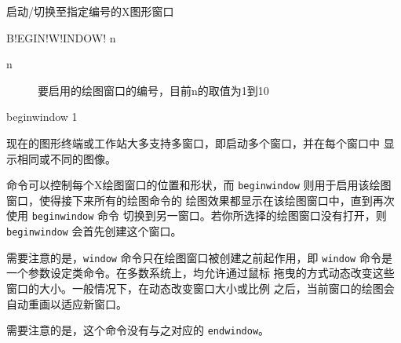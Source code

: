 \label{cmd:beginwindow}

启动/切换至指定编号的X图形窗口

\begin{SACSTX}
B!EGIN!W!INDOW! n
\end{SACSTX}

\begin{description}
\item [n] 要启用的绘图窗口的编号，目前n的取值为1到10
\end{description}

\begin{SACDFT}
beginwindow 1
\end{SACDFT}

现在的图形终端或工作站大多支持多窗口，即启动多个窗口，并在每个窗口中
显示相同或不同的图像。

 命令可以控制每个X绘图窗口的位置和形状，而
\texttt{beginwindow} 则用于启用该绘图窗口，使得接下来所有的绘图命令的
绘图效果都显示在该绘图窗口中，直到再次使用 \texttt{beginwindow} 命令
切换到另一窗口。若你所选择的绘图窗口没有打开，则 \texttt{beginwindow}
会首先创建这个窗口。

需要注意的是，\texttt{window} 命令只在绘图窗口被创建之前起作用，即
\texttt{window} 命令是一个参数设定类命令。在多数系统上，均允许通过鼠标
拖曳的方式动态改变这些窗口的大小。一般情况下，在动态改变窗口大小或比例
之后，当前窗口的绘图会自动重画以适应新窗口。

需要注意的是，这个命令没有与之对应的 \texttt{endwindow}。
